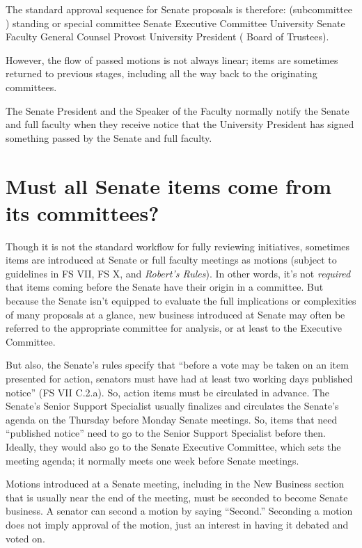 \documentclass[12pt]{article}
\begin{document}
The standard approval sequence for Senate proposals is therefore:
(subcommittee \rightarrow{}) standing or special committee
\rightarrow{} Senate Executive Committee \rightarrow{} University Senate
\rightarrow{} Faculty \rightarrow{} General Counsel \rightarrow{}
Provost \rightarrow{} University President ( \rightarrow{} Board of
Trustees).

However, the flow of passed motions is not always linear; items are
sometimes returned to previous stages, including all the way back to the
originating committees.

The Senate President and the Speaker of the Faculty normally notify the
Senate and full faculty when they receive notice that the University
President has signed something passed by the Senate and full faculty.

\section{Must all Senate items come from its
committees?}\label{must-all-senate-items-come-from-its-committees}

Though it is not the standard workflow for fully reviewing initiatives,
sometimes items are introduced at Senate or full faculty meetings as
motions (subject to guidelines in FS VII, FS X, and \emph{Robert's
Rules}). In other words, it's not \emph{required} that items coming
before the Senate have their origin in a committee. But because the
Senate isn't equipped to evaluate the full implications or complexities
of many proposals at a glance, new business introduced at Senate may
often be referred to the appropriate committee for analysis, or at least
to the Executive Committee.

But also, the Senate's rules specify that ``before a vote may be taken
on an item presented for action, senators must have had at least two
working days published notice'' (FS VII C.2.a). So, action items must be
circulated in advance. The Senate's Senior Support Specialist usually
finalizes and circulates the Senate's agenda on the Thursday before
Monday Senate meetings. So, items that need ``published notice'' need to
go to the Senior Support Specialist before then. Ideally, they would
also go to the Senate Executive Committee, which sets the meeting
agenda; it normally meets one week before Senate meetings.

Motions introduced at a Senate meeting, including in the New Business section that is usually near the end of the meeting, must be seconded to become Senate business. A senator can second a motion by saying “Second.” Seconding a motion does not imply approval of the motion, just an interest in having it debated and voted on.
\end{document}
